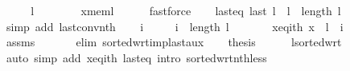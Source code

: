 \begin{isabellebody}
%
\endisadeliminvisible
%
\isadelimproof
%
\endisadelimproof
%
\isatagproof
{}\isamarkupfalse%
\ {\isacharminus}{\kern0pt}\isanewline
\ \ \isamarkupfalse%
\ {\isachardoublequoteopen}l\ {\isasymnoteq}\ {\isacharbrackleft}{\kern0pt}{\isacharbrackright}{\kern0pt}{\isachardoublequoteclose}\isanewline
\ \ \ \ \isamarkupfalse%
\ x{\isacharunderscore}{\kern0pt}mem{\isacharunderscore}{\kern0pt}l\isanewline
\ \ \ \ \isamarkupfalse%
\ fastforce\isanewline
\ \ \isamarkupfalse%
\ last{\isacharunderscore}{\kern0pt}eq{\isacharcolon}{\kern0pt}\ {\isachardoublequoteopen}last\ l\ {\isacharequal}{\kern0pt}\ l\ {\isacharbang}{\kern0pt}\ {\isacharparenleft}{\kern0pt}length\ l\ {\isacharminus}{\kern0pt}\ {}{\isacharparenright}{\kern0pt}{\isachardoublequoteclose}\isanewline
\ \ \ \ \isamarkupfalse%
\ {\isacharparenleft}{\kern0pt}simp\ add{\isacharcolon}{\kern0pt}\ last{\isacharunderscore}{\kern0pt}conv{\isacharunderscore}{\kern0pt}nth{\isacharparenright}{\kern0pt}\isanewline
\ \ \isamarkupfalse%
\ i\ \isanewline
\ \ \ \ {\isachardoublequoteopen}i\ {\isacharless}{\kern0pt}\ length\ l\ {\isacharminus}{\kern0pt}\ {}{\isachardoublequoteclose}\ \isanewline
\ \ \ \ x{\isacharunderscore}{\kern0pt}eq{\isacharunderscore}{\kern0pt}ith{\isacharcolon}{\kern0pt}\ {\isachardoublequoteopen}x\ {\isacharequal}{\kern0pt}\ l\ {\isacharbang}{\kern0pt}\ i{\isachardoublequoteclose}\isanewline
\ \ \ \ \isamarkupfalse%
\ assms{\isacharparenleft}{\kern0pt}{}{\isacharcomma}{\kern0pt}\ {}{\isacharparenright}{\kern0pt}\isanewline
\ \ \ \ \isamarkupfalse%
\ {\isacharparenleft}{\kern0pt}elim\ sorted{\isacharunderscore}{\kern0pt}wrt{\isacharunderscore}{\kern0pt}imp{\isacharunderscore}{\kern0pt}last{\isacharunderscore}{\kern0pt}aux{\isacharparenright}{\kern0pt}\isanewline
\ \ \isamarkupfalse%
\ {\isacharquery}{\kern0pt}thesis\isanewline
\ \ \ \ \isamarkupfalse%
\ l{\isacharunderscore}{\kern0pt}sorted{\isacharunderscore}{\kern0pt}wrt\isanewline
\ \ \ \ \isamarkupfalse%
\ {\isacharparenleft}{\kern0pt}auto\ simp\ add{\isacharcolon}{\kern0pt}\ x{\isacharunderscore}{\kern0pt}eq{\isacharunderscore}{\kern0pt}ith\ last{\isacharunderscore}{\kern0pt}eq\ intro{\isacharcolon}{\kern0pt}\ sorted{\isacharunderscore}{\kern0pt}wrt{\isacharunderscore}{\kern0pt}nth{\isacharunderscore}{\kern0pt}less{\isacharparenright}{\kern0pt}\isanewline
{}\isamarkupfalse%

\end{isabellebody}
